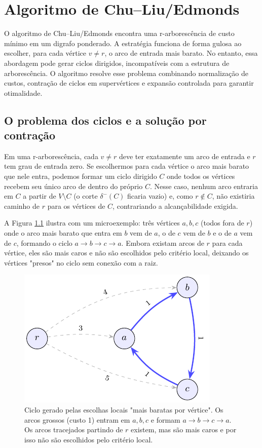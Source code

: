\chapter{Algoritmo de Chu–Liu/Edmonds}

O algoritmo de Chu–Liu/Edmonds encontra uma r-arborescência de custo mínimo em um digrafo ponderado. A estratégia funciona de forma gulosa ao escolher, para cada vértice \(v\neq r\), o arco de entrada mais barato. No entanto, essa abordagem pode gerar ciclos dirigidos, incompatíveis com a estrutura de arborescência. O algoritmo resolve esse problema combinando normalização de custos, contração de ciclos em supervértices e expansão controlada para garantir otimalidade.

\section{O problema dos ciclos e a solução por contração}

Em uma r-arborescência, cada \(v\neq r\) deve ter exatamente um arco de entrada e \(r\) tem grau de entrada zero. Se escolhermos para cada vértice o arco mais barato que nele entra, podemos formar um ciclo dirigido \(C\) onde todos os vértices recebem seu único arco de dentro do próprio \(C\). Nesse caso, nenhum arco entraria em \(C\) a partir de \(V\setminus C\) (o corte \(\delta^-(C)\) ficaria vazio) e, como \(r\notin C\), não existiria caminho de \(r\) para os vértices de \(C\), contrariando a alcançabilidade exigida.

A Figura \ref{fig:chu-liu-cycle-micro} ilustra com um microexemplo: três vértices \(a,b,c\) (todos fora de \(r\)) onde o arco mais barato que entra em \(b\) vem de \(a\), o de \(c\) vem de \(b\) e o de \(a\) vem de \(c\), formando o ciclo \(a\to b\to c\to a\). Embora existam arcos de \(r\) para cada vértice, eles são mais caros e não são escolhidos pelo critério local, deixando os vértices "presos" no ciclo sem conexão com a raiz.

\begin{figure}[H]
    \centering
    \includegraphics[width=0.9\linewidth]{figures/fig_chu_liu_cycle_micro.pdf}
    \caption{Ciclo gerado pelas escolhas locais "mais baratas por vértice". Os arcos grossos (custo 1) entram em \(a,b,c\) e formam \(a\to b\to c\to a\). Os arcos tracejados partindo de \(r\) existem, mas são mais caros e por isso não são escolhidos pelo critério local.}
    \label{fig:chu-liu-cycle-micro}
\end{figure}

